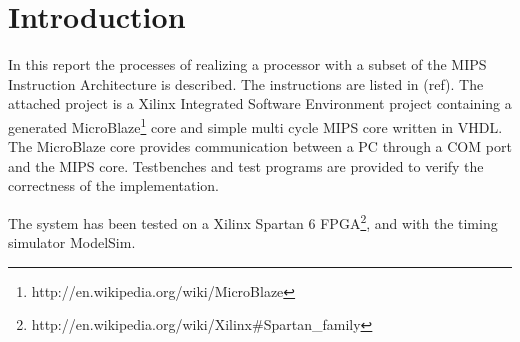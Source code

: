 \section{Introduction}

In this report the processes of realizing a processor with a subset of the MIPS Instruction Architecture is described. The instructions are listed in (ref). The attached project is a Xilinx Integrated Software Environment project containing a generated MicroBlaze\footnote{http://en.wikipedia.org/wiki/MicroBlaze} core and simple multi cycle MIPS core written in VHDL. The MicroBlaze core provides communication between a PC through a COM port and the MIPS core. Testbenches and test programs are provided to verify the correctness of the implementation. 

The system has been tested on a Xilinx Spartan 6 FPGA\footnote{http://en.wikipedia.org/wiki/Xilinx\#Spartan\_family}, and with the timing simulator ModelSim.
